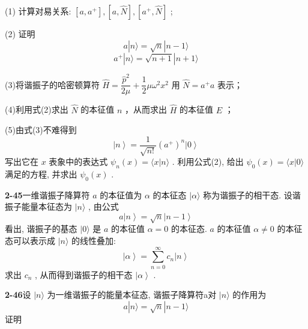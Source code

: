 (1) 计算对易关系: $\displaystyle [a, a^{+}], [a, \hat{N}], [a^{+}, \hat{N}]$ ;

(2) 证明
\begin{equation}\tag{2}
a | n \rangle = \sqrt {n} | n - 1 \rangle
\end{equation}
\begin{equation}\tag{3}
a ^ {+} | n \rangle = \sqrt {n + 1} | n + 1 \rangle
\end{equation}

(3)将谐振子的哈密顿算符 $\displaystyle \hat{H} = \dfrac{\hat{p}^2}{2\mu} + \dfrac{1}{2}\mu \omega^2 x^2$ 用 $\displaystyle \hat{N} = a^+ a$ 表示；

(4)利用式(2)求出 $\displaystyle \hat{N}$ 的本征值 $\displaystyle n$ ，从而求出 $\displaystyle \hat{H}$ 的本征值 $\displaystyle E$ ；

(5)由式(3)不难得到
\begin{equation}\tag{4}
\left| n \right\rangle = \dfrac {1}{\sqrt {n !}} (a ^ {+}) ^ {n} \left| 0 \right\rangle
\end{equation}
写出它在 $\displaystyle x$ 表象中的表达式 $\displaystyle \psi_{n}(x) = \langle x|n\rangle$ . 利用公式(2), 给出 $\displaystyle \psi_{0}(x) = \langle x|0\rangle$ 满足的方程, 并求出 $\displaystyle \psi_{0}(x)$ .

\vfill

\newpage

\textbf{2-45}\quad 一维谐振子降算符 $\displaystyle a$ 的本征值为 $\displaystyle \alpha$ 的本征态 $\displaystyle |\alpha\rangle$ 称为谐振子的相干态. 设谐振子能量本征态为 $\displaystyle |n\rangle$ , 由公式
\begin{equation}\tag{1}
a \left| n \right\rangle = \sqrt {n} \left| n - 1 \right\rangle
\end{equation}
看出, 谐振子的基态 $\displaystyle |0\rangle$ 是 $\displaystyle a$ 的本征值 $\displaystyle \alpha = 0$ 的本征态. $\displaystyle a$ 的本征值 $\displaystyle \alpha \neq 0$ 的本征态可以表示成 $\displaystyle |n\rangle$ 的线性叠加:
\begin{equation}\tag{2}
\left| \alpha \right\rangle = \sum_ {n = 0} ^ {\infty} c _ {n} \left| n \right\rangle
\end{equation}
求出 $\displaystyle c_{n}$ , 从而得到谐振子的相干态 $\displaystyle \left|\alpha\right\rangle$ .

\vfill

\newpage

\textbf{2-46}\quad 设 $\displaystyle |n\rangle$ 为一维谐振子的能量本征态, 谐振子降算符a对 $\displaystyle |n\rangle$ 的作用为
\begin{equation}\tag{1}
a | n \rangle = \sqrt {n} | n - 1 \rangle
\end{equation}
证明

